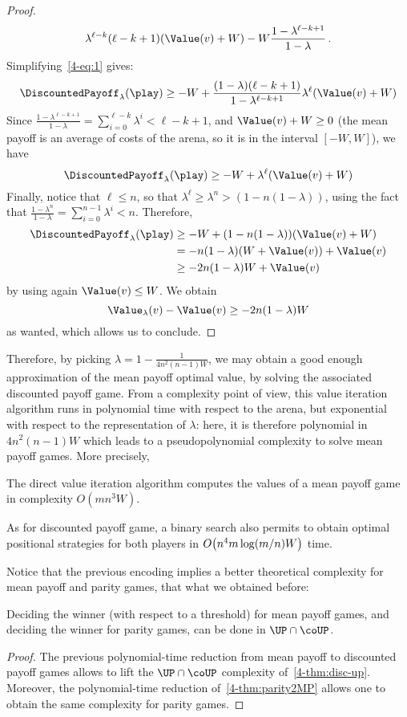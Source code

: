 \begin{proof}
\[    \lambda^{\ell-k}(\ell-k+1)(\Value(v)+W)-
    W\frac{1-\lambda^{\ell-k+1}}{1-\lambda} \,.\]
  Simplifying~\cref{4-eq:1} gives:
  \[\DiscountedPayoff_\lambda(\play)
    \geq -W+ \frac{(1-\lambda)(\ell-k+1)}{1-\lambda^{\ell-k+1}}
    \lambda^\ell (\Value(v) + W)\] Since
  $\frac {1-\lambda^{\ell-k+1}}{1-\lambda} =
  \sum_{i=0}^{\ell-k}\lambda^i < \ell-k+1$, and $\Value(v) + W\geq 0$
  (the mean payoff is an average of costs of the arena, so it is in
  the interval $[-W,W]$), we have
  \[\DiscountedPayoff_\lambda(\play)
    \geq -W + \lambda^\ell (\Value(v) + W)\] Finally, notice that
  $\ell\leq n$, so that
  $\lambda^\ell\geq \lambda^{n}>(1-n(1-\lambda))$, using the fact
  that
  $\frac{1-\lambda^{n}}{1-\lambda} = \sum_{i=0}^{n-1}\lambda^i <
  n$. Therefore,
  \begin{align*}
    \DiscountedPayoff_\lambda(\play)
    &\geq -W + (1-n(1-\lambda)) (\Value(v) + W)\\
    &= -n(1-\lambda)(W+\Value(v)) + \Value(v)\\
    &\geq -2n(1-\lambda)W + \Value(v)
  \end{align*}
  by using again $\Value(v)\leq W$. We obtain
  \[\Value_\lambda(v)-\Value(v)\geq -2n(1-\lambda)W\]
  as wanted, which allows us to conclude. 
\end{proof}

Therefore, by picking $\lambda = 1-\frac 1{4n^2(n-1)W}$, we may
obtain a good enough approximation of the mean payoff optimal value,
by solving the associated discounted payoff game. From a complexity
point of view, this value iteration algorithm runs in polynomial time
with respect to the arena, but exponential with respect to the
representation of $\lambda$: here, it is therefore polynomial in
$4n^2(n-1)W$ which leads to a pseudopolynomial complexity to solve
mean payoff games. More precisely,

\begin{theorem}\label{4-thm:MP-direct-value-iteration}
  The direct value iteration algorithm computes the values of a
  mean payoff game in complexity $O(mn^3W)$.
\end{theorem}

As for discounted payoff game, a binary search also
permits to obtain optimal positional strategies for both players in
$O\big(n^4m\log(m/n)W\big)$ time.

Notice that the previous encoding implies a better theoretical
complexity for mean payoff and parity games, that what we obtained
before:
\begin{corollary}\label{4-col:UP}
  Deciding the winner (with respect to a threshold) for mean payoff
  games, and deciding the winner for parity games, can be done in
  $\UP\cap\coUP$.
\end{corollary}
\begin{proof}
  The previous polynomial-time reduction from mean payoff to
  discounted payoff games allows to lift the $\UP\cap\coUP$ complexity
  of~\cref{4-thm:disc-up}. Moreover, the polynomial-time reduction
  of~\cref{4-thm:parity2MP} allows one to obtain the same complexity for
  parity games. 
\end{proof}
